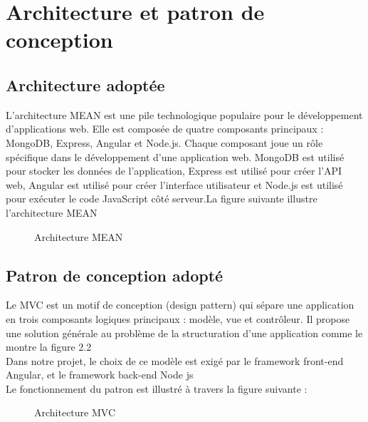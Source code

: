 \section{Architecture et patron de conception }
\subsection{Architecture adoptée }
L'architecture MEAN est une pile technologique populaire pour le développement d'applications web. Elle est composée de quatre composants principaux : MongoDB, Express, Angular et Node.js. Chaque composant joue un rôle spécifique dans le développement d'une application web. MongoDB est utilisé pour stocker les données de l'application, Express est utilisé pour créer l'API web, Angular est utilisé pour créer l'interface utilisateur et Node.js est utilisé pour exécuter le code JavaScript côté serveur.La figure suivante illustre l'architecture MEAN
\begin{figure}[H]
    \centering
    \caption{Architecture MEAN }
    \label{fig:logo_tt}
\end{figure}
\subsection{  Patron de conception adopté }
Le MVC est un motif de conception (design pattern) qui sépare une application en trois composants logiques principaux : modèle, vue et contrôleur. Il propose une solution générale au problème de la structuration d’une application comme le montre la figure 2.2 \\
Dans notre projet, le choix de ce modèle est exigé par le framework front-end   Angular, et le framework back-end Node js \\
Le fonctionnement du patron est illustré à travers la figure suivante : 
\begin{figure}[H]
    \centering
    \caption{Architecture MVC \cite[]{MVC} }
    \label{fig:logo_tt}
\end{figure}
